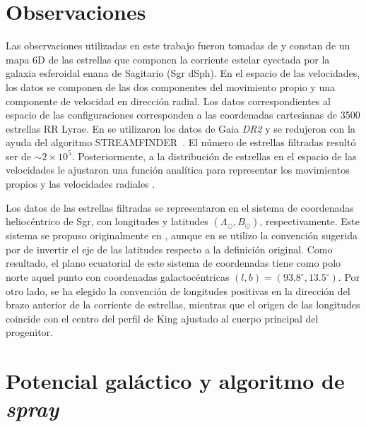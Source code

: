 \documentclass[baaa]{baaa}
\begin{document}

\section{Observaciones}\label{sec:observaciones}

Las observaciones utilizadas en este trabajo fueron tomadas de \cite{Ibata2020} y constan de un mapa 6D de las estrellas que componen la corriente estelar eyectada por la galaxia esferoidal enana de Sagitario (Sgr dSph). En el espacio de las velocidades, los datos se componen de las dos componentes del movimiento propio y una componente de velocidad en dirección radial. Los datos correspondientes al espacio de las configuraciones corresponden a las coordenadas cartesianas de 3500 estrellas RR Lyrae. En \cite{Ibata2020} se utilizaron los datos de Gaia \textit{DR2} y se redujeron con la ayuda del algoritmo STREAMFINDER~\citep{Malhan2018}. El número de estrellas filtradas resultó ser de $\sim 2\times 10^5$. Posteriormente, a la distribución de estrellas en el espacio de las velocidades le ajustaron una función analítica para representar los movimientos propios y las velocidades radiales \citep[ver Ec. (1) de ][]{Ibata2020}.

Los datos de las estrellas filtradas se representaron en el sistema de coordenadas heliocéntrico de Sgr, con longitudes y latitudes $(\Lambda_{\odot}, B_{\odot})$, respectivamente. Este sistema se propuso originalmente en \cite{Majewski2003}, aunque en \cite{Ibata2020} se utilizo la convención sugerida por \cite{Koposov2012} de invertir el eje de las latitudes respecto a la definición original. Como resultado, el plano ecuatorial de este sistema de coordenadas tiene como polo norte aquel punto con coordenadas galactocéntricas $(l,b)=(93.8^{\circ},13.5^{\circ})$. Por otro lado, se ha elegido la convención de longitudes positivas en la dirección del brazo anterior de la corriente de estrellas, mientras que el origen de las longitudes coincide con el centro del perfil de King ajustado al cuerpo principal del progenitor.

\section{Potencial galáctico y algoritmo de \textit{spray}}\label{sec:modelo}
\end{document}
